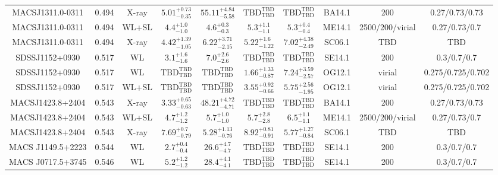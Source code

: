 \begin{table}
\begin{tabular}{cccccccccc}
MACSJ1311.0-0311 & 0.494 & X-ray & ${5.01}^{+0.73}_{-0.35}$ & ${55.11}^{+4.84}_{-5.58}$ & ${\mathrm{TBD}}^{\mathrm{TBD}}_{\mathrm{TBD}}$ & ${\mathrm{TBD}}^{\mathrm{TBD}}_{\mathrm{TBD}}$ & BA14.1 & 200 & 0.27/0.73/0.73 \\
MACSJ1311.0-0311 & 0.494 & WL+SL & ${4.4}^{+1.0}_{-1.0}$ & ${4.6}^{+0.3}_{-0.3}$ & ${5.3}^{+1.1}_{-1.1}$ & ${5.3}^{+0.4}_{-0.4}$ & ME14.1 & 2500/200/virial & 0.27/0.73/0.7 \\
MACSJ1311.0-0311 & 0.494 & X-ray & ${4.42}^{+1.39}_{-1.05}$ & ${6.22}^{+3.71}_{-2.15}$ & ${5.22}^{+1.6}_{-1.22}$ & ${7.02}^{+4.38}_{-2.49}$ & SC06.1 & TBD & TBD \\
SDSSJ1152+0930 & 0.517 & WL & ${3.1}^{+1.6}_{-1.6}$ & ${7.0}^{+2.6}_{-2.6}$ & ${\mathrm{TBD}}^{\mathrm{TBD}}_{\mathrm{TBD}}$ & ${\mathrm{TBD}}^{\mathrm{TBD}}_{\mathrm{TBD}}$ & SE14.1 & 200 & 0.3/0.7/0.7 \\
SDSSJ1152+0930 & 0.517 & WL & ${\mathrm{TBD}}^{\mathrm{TBD}}_{\mathrm{TBD}}$ & ${\mathrm{TBD}}^{\mathrm{TBD}}_{\mathrm{TBD}}$ & ${1.66}^{+1.33}_{-0.87}$ & ${7.24}^{+3.59}_{-2.57}$ & OG12.1 & virial & 0.275/0.725/0.702 \\
SDSSJ1152+0930 & 0.517 & WL+SL & ${\mathrm{TBD}}^{\mathrm{TBD}}_{\mathrm{TBD}}$ & ${\mathrm{TBD}}^{\mathrm{TBD}}_{\mathrm{TBD}}$ & ${3.55}^{+0.92}_{-0.66}$ & ${5.75}^{+2.56}_{-1.95}$ & OG12.1 & virial & 0.275/0.725/0.702 \\
MACSJ1423.8+2404 & 0.543 & X-ray & ${3.33}^{+0.65}_{-0.63}$ & ${48.21}^{+4.72}_{-4.71}$ & ${\mathrm{TBD}}^{\mathrm{TBD}}_{\mathrm{TBD}}$ & ${\mathrm{TBD}}^{\mathrm{TBD}}_{\mathrm{TBD}}$ & BA14.1 & 200 & 0.27/0.73/0.73 \\
MACSJ1423.8+2404 & 0.543 & WL+SL & ${4.7}^{+1.2}_{-1.2}$ & ${5.7}^{+1.0}_{-1.0}$ & ${5.7}^{+2.8}_{-2.8}$ & ${6.5}^{+1.1}_{-1.1}$ & ME14.1 & 2500/200/virial & 0.27/0.73/0.7 \\
MACSJ1423.8+2404 & 0.543 & X-ray & ${7.69}^{+0.7}_{-0.79}$ & ${5.28}^{+1.13}_{-0.76}$ & ${8.92}^{+0.81}_{-0.91}$ & ${5.77}^{+1.27}_{-0.84}$ & SC06.1 & TBD & TBD \\
MACS J1149.5+2223 & 0.544 & WL & ${2.7}^{+0.4}_{-0.4}$ & ${26.6}^{+4.7}_{-4.7}$ & ${\mathrm{TBD}}^{\mathrm{TBD}}_{\mathrm{TBD}}$ & ${\mathrm{TBD}}^{\mathrm{TBD}}_{\mathrm{TBD}}$ & SE14.1 & 200 & 0.3/0.7/0.7 \\
MACS J0717.5+3745 & 0.546 & WL & ${5.2}^{+1.2}_{-1.2}$ & ${28.4}^{+4.1}_{-4.1}$ & ${\mathrm{TBD}}^{\mathrm{TBD}}_{\mathrm{TBD}}$ & ${\mathrm{TBD}}^{\mathrm{TBD}}_{\mathrm{TBD}}$ & SE14.1 & 200 & 0.3/0.7/0.7 \\

\end{tabular}
\end{table}
